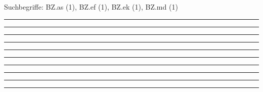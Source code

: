 \documentclass[a4paper,12pt]{report}
\begin{document}

 \scriptsize Suchbegriffe: BZ.as (1), BZ.ef (1), BZ.ek (1), BZ.md (1)\normalsize 
 
%
\hrule	 \leer

%
\hrule	 \leer

%
\hrule	 \leer

%
\hrule	 \leer

%
\hrule	 \leer

%
\hrule	 \leer

%
\hrule	 \leer

%
\hrule	 \leer

%
\hrule	 \leer

%
\hrule	 \leer

\end{document}
